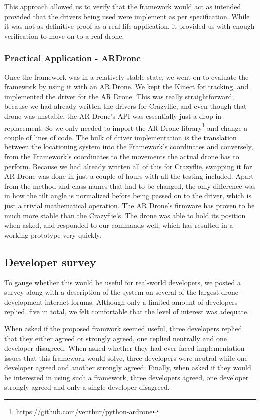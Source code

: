
This approach allowed us to verify that the framework would act as intended provided that the drivers being used were implement as per specification.  While it was not as definitive proof as a real-life application, it provided us with enough verification to move on to a real drone.

\subsubsection{Practical Application - ARDrone}
Once the framework was in a relatively stable state, we went on to evaluate the framework by using it with an AR Drone. We kept the Kinect for tracking, and implemented the driver for the AR Drone. This was really straightforward, because we had already written the drivers for Crazyflie, and even though that drone was unstable, the AR Drone's API was essentially just a drop-in replacement. So we only needed to import the AR Drone library\footnote{https://github.com/venthur/python-ardrone} and change a couple of lines of code. The bulk of driver implementation is the translation between the locationing system into the Framework's coordinates and conversely, from the Framework's coordinates to the movements the actual drone has to perform. Because we had already written all of this for Crazyflie, swapping it for AR Drone was done in just a couple of hours with all the testing included. Apart from the method and class names that had to be changed, the only difference was in how the tilt angle is normalized before being passed on to the driver, which is just a trivial mathematical operation. The AR Drone's firmware has proven to be much more stable than the Crazyflie's. The drone was able to hold its position when asked, and responded to our commands well, which has resulted in a working prototype very quickly.

\subsection{Developer survey}
To gauge whether this would be useful for real-world developers, we posted a survey along with a description of the system on several of the largest drone-development internet forums. Although only a limited amount of developers replied, five in total, we felt comfortable that the level of interest was adequate. 

When asked if the proposed framwork seemed useful, three developers replied that they either agreed or strongly agreed, one replied neutrally and one developer disagreed. When asked whether they had ever faced implementation issues that this framework would solve, three developers were neutral while one developer agreed and another strongly agreed. Finally, when asked if they would be interested in using such a framework, three developers agreed, one developer strongly agreed and only a single developer disagreed.

